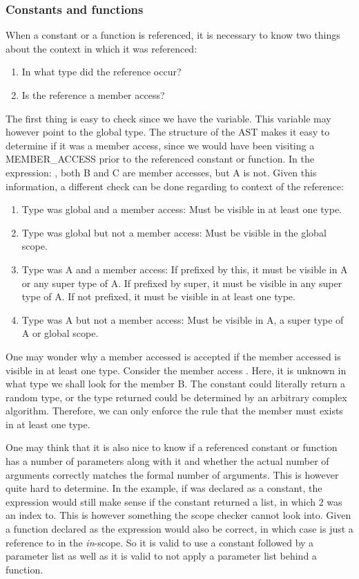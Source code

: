 \subsubsection{Constants and functions}
When a constant or a function is referenced, it is necessary to know two things about the context in which it was referenced:
\begin{enumerate}
\item In what type did the reference occur?
\item Is the reference a member access?
\end{enumerate}
The first thing is easy to check since we have the  variable. This variable may however point to the global type. The structure of the AST makes it easy to determine if it was a member access, since we would have been visiting a MEMBER\_ACCESS  prior to the referenced constant or function. In the expression: , both B and C are member accesses, but A is not.
Given this information, a different check can be done regarding to context of the reference:
\begin{enumerate}
\item Type was global and a member access: Must be visible in at least one type.
\item Type was global but not a member access: Must be visible in the global scope.
\item Type was A and a member access: If prefixed by this, it must be visible in A or any super type of A. If prefixed by super, it must be visible in any super type of A. If not prefixed, it must be visible in at least one type.
\item Type was A but not a member access: Must be visible in A, a super type of A or global scope.
\end{enumerate}
One may wonder why a member accessed is accepted if the member accessed is visible in at least one type. Consider the member access . Here, it is unknown in what type we shall look for the member B. The constant  could literally return a random type, or the type returned could be determined by an arbitrary complex algorithm. Therefore, we can only enforce the rule that the member  must exists in at least one type.

One may think that it is also nice to know if a referenced constant or function has a number of parameters along with it and whether the actual number of arguments correctly matches the formal number of arguments. This is however quite hard to determine. In the example, if  was declared as a constant, the expression  would still make sense if the constant returned a list, in which 2 was an index to. This is however something the scope checker cannot look into. Given a function declared as  the expression  would also be correct, in which case  is just a reference to  in the \textit{in}-scope. So it is valid to use a constant followed by a parameter list as well as it is valid to not apply a parameter list behind a function. 

